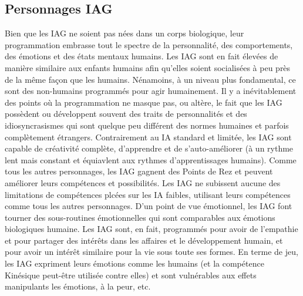 \subsection{Personnages IAG} 

Bien que les IAG ne soient pas nées dans un corps biologique, leur programmation embrasse tout le spectre de la personnalité, des comportements, des émotions et des états mentaux humains. Les IAG sont en fait élevées de manière similaire aux enfants humains afin qu'elles soient socialisées à peu près de la même façon que les humains. Nénamoins, à un niveau plus fondamental, ce sont des non-humains programmés pour agir humainement. Il y a inévitablement des points où la programmation ne masque pas, ou altère, le fait que les IAG possèdent ou développent souvent des traits de personnalités et des idiosyncrasismes qui sont quelque peu différent des normes humaines et parfois complètement étrangers. Contrairement au IA standard et limitée, les IAG sont capable de créativité complète, d'apprendre et de s'auto-améliorer (à un rythme lent mais constant et équiavlent aux rythmes d'apprentissages humains). Comme tous les autres personnages, les IAG gagnent des Points de Rez et peuvent améliorer leurs compétences et possibilités. Les IAG ne subissent aucune des limitations de compétences plcées sur les IA faibles, utilisant leurs compétences comme tous les autres personnages. D'un point de vue émotionnel, les IAG font tourner des sous-routines émotionnelles qui sont comparables aux émotions biologiques humaine. Les IAG sont, en fait, programmés pour avoir de l'empathie et pour partager des intérêts dans les affaires et le développement humain, et pour avoir un intérêt similaire pour la vie sous toute ses formes. En terme de jeu, les IAG expriment leurs émotions comme les humains (et la compétence Kinésique peut-être utilisée contre elles) et sont vulnérables aux effets manipulants les émotions, à la peur, etc. 









